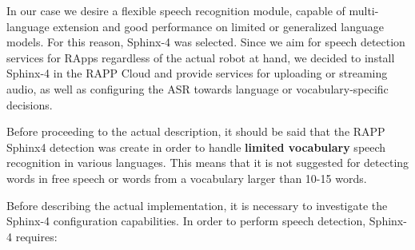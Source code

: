 In our case we desire a flexible speech recognition module, capable of multi-\/language extension and good performance on limited or generalized language models. For this reason, Sphinx-\/4 was selected. Since we aim for speech detection services for R\-Apps regardless of the actual robot at hand, we decided to install Sphinx-\/4 in the R\-A\-P\-P Cloud and provide services for uploading or streaming audio, as well as configuring the A\-S\-R towards language or vocabulary-\/specific decisions.

Before proceeding to the actual description, it should be said that the R\-A\-P\-P Sphinx4 detection was create in order to handle {\bfseries limited vocabulary} speech recognition in various languages. This means that it is not suggested for detecting words in free speech or words from a vocabulary larger than 10-\/15 words.

Before describing the actual implementation, it is necessary to investigate the Sphinx-\/4 configuration capabilities. In order to perform speech detection, Sphinx-\/4 requires\-:



